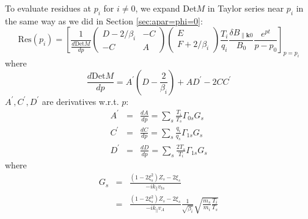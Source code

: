 \documentclass[12pt]{article}
\begin{document}
To evaluate residues at $p_i$ for $i\neq 0$, we expand Det$M$ in Taylor series near $p_i$ in the same way as we did in Section \ref{sec:apar=phi=0}:
%
\begin{equation}
\mathrm{Res}(p_i) = 
\left[
\frac{1}{\frac{d\mathrm{Det}M}{dp}}
\begin{pmatrix}
D-2/\beta_i  & -C\\
-C & A
\end{pmatrix}
\begin{pmatrix}
E \\
F + 2/\beta_i
\end{pmatrix}
 \frac{T_i}{q_i} \frac{\delta B_{\parallel \mathbf{k}0}}{B_0}
 \frac{e^{pt}}{p-p_0}
\right]_{p=p_i}
\end{equation}
where 
\begin{equation}
\frac{d\mathrm{Det}M}{dp} = A^\prime\left(D-\frac{2}{\beta_i}\right) + 
AD^\prime - 2CC^\prime 
\end{equation}
%
$A^\prime, C^\prime, D^\prime$ are derivatives w.r.t. $p$:
\begin{eqnarray}
A^\prime &=&\frac{dA}{dp} = \sum_s \frac{T_i}{T_s} \Gamma_{0s}G_s \\
C^\prime &=& \frac{dC}{dp} = \sum_s \frac{q_i}{q_s} \Gamma_{1s} G_s \\
D^\prime &=& \frac{dD}{dp} = \sum_s \frac{2T_s}{T_i} \Gamma_{1s} G_s 
\end{eqnarray}
where 
\begin{eqnarray}
G_s &=& \frac{\left(1-2\xi_s^2\right) Z_s - 2 \xi_s}{-ik_\parallel v_{ts}} \nonumber \\
&=& \frac{\left(1-2\xi_s^2\right) Z_s - 2 \xi_s}{-ik_\parallel v_{A}} \frac{1}{\sqrt{\beta_i}}
\sqrt{\frac{m_s}{m_i}\frac{T_i}{T_s}}
\end{eqnarray}




\end{document}
